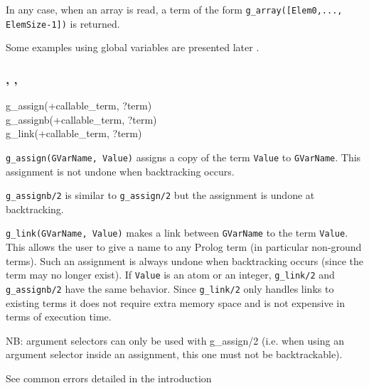 In any case, when an array is read, a term of the form
\texttt{g\_array([Elem0,..., ElemSize-1])} is returned.

Some examples using global variables are presented later .

\subsubsection{,\label{g-assign/2}
               ,
               }


\begin{TemplatesOneCol}
g\_assign(+callable\_term, ?term)\\
g\_assignb(+callable\_term, ?term)\\
g\_link(+callable\_term, ?term)

\end{TemplatesOneCol}

\Description

\texttt{g\_assign(GVarName, Value)} assigns a copy of the term
\texttt{Value} to \texttt{GVarName}. This assignment is not undone when
backtracking occurs.

\texttt{g\_assignb/2} is similar to \texttt{g\_assign/2} but the assignment
is undone at backtracking.

\texttt{g\_link(GVarName, Value)} makes a link between \texttt{GVarName} to
the term \texttt{Value}. This allows the user to give a name to any Prolog
term (in particular non-ground terms). Such an assignment is always undone
when backtracking occurs (since the term may no longer exist). If
\texttt{Value} is an atom or an integer, \texttt{g\_link/2} and
\texttt{g\_assignb/2} have the same behavior. Since \texttt{g\_link/2} only
handles links to existing terms it does not require extra memory space and
is not expensive in terms of execution time.

NB: argument selectors can only be used with {g\_assign/2} (i.e. when using
an argument selector inside an assignment, this one must not be
backtrackable).

\Errors

See common errors detailed in the introduction 

\begin{PlErrorsNoTitle}


\end{PlErrorsNoTitle}


